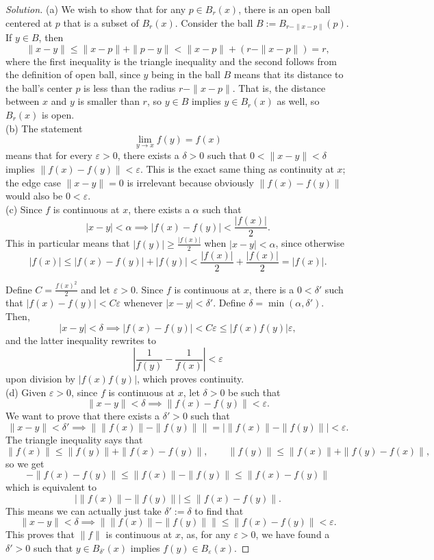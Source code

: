 \documentclass[11pt]{scrartcl}
\providecommand{\eps}{\varepsilon}
\newenvironment{soln}{\begin{proof}[Solution]}{\end{proof}}
\providecommand{\abs}[1]{\left|#1\right|}
\begin{document}
\begin{soln}
	(a) We wish to show that for any $p\in B_r(x)$, there is
	an open ball centered at $p$ that is a subset of $B_r(x)$.
	Consider the ball $B := B_{r-\|x-p\|}(p)$. If $y\in B$, then
	\[\|x-y\| \le \|x-p\| + \|p-y\| < \|x-p\| + (r - \|x-p\|) = r,\]
	where the first inequality is the triangle inequality
	and the second follows from the definition of open ball, since
	$y$ being in the ball $B$ means that its distance to
	the ball's center $p$ is less than the radius $r - \|x-p\|$.
	That is, the distance between $x$ and $y$ is smaller than $r$,
	so $y\in B$ implies $y\in B_r(x)$ as well, so $B_r(x)$ is open.\\
	
	(b) The statement
	\[\lim_{y\to x}f(y) = f(x)\]
	means that for every $\eps > 0$,
	there exists a $\delta > 0$ such that $0 < \|x-y\| < \delta$
	implies $\|f(x) - f(y)\| < \eps$. This is the exact same thing
	as continuity at $x$; the edge case $\|x-y\| = 0$ is irrelevant
	because obviously $\|f(x) - f(y)\|$ would also be $0 < \eps$.\\
	
	(c) Since $f$ is continuous at $x$, there exists a $\alpha$ such that
	\[|x-y|<\alpha\implies |f(x)-f(y)| < \frac{|f(x)|}{2}.\]
	This in particular means that $|f(y)| \ge \frac{|f(x)|}{2}$
	when $|x-y|<\alpha$, since otherwise
	\[|f(x)| \le |f(x) - f(y)| + |f(y)| <
	\frac{|f(x)|}{2} + \frac{|f(x)|}{2} = |f(x)|.\]
	
	Define $C = \frac{f(x)^2}{2}$ and let $\eps > 0$.
	Since $f$ is continuous at $x$, there is a $0 < \delta'$ such that
	$|f(x)-f(y)| < C\eps$ whenever $|x-y|<\delta'$.
	Define $\delta = \min(\alpha,\delta')$. Then,
	\[|x-y| < \delta\implies |f(x) - f(y)| < C\eps \le |f(x)f(y)|\eps,\]
	and the latter inequality rewrites to
	\[\left|\frac{1}{f(y)} - \frac{1}{f(x)}\right| < \eps\]
	upon division by $|f(x)f(y)|$, which proves continuity.
	\\
	
	(d) Given $\eps > 0$, since $f$ is continuous at $x$,
	let $\delta > 0$ be such that
	\[\|x-y\| < \delta \implies \|f(x) - f(y)\| < \eps.\]
	We want to prove that there exists a $\delta'>0$ such that
	\[\|x-y\| < \delta'\implies \| \|f(x)\| - \|f(y)\|\|
	= \abs{\|f(x)\| - \|f(y)\|} < \eps.\]
	The triangle inequality says that
	\[\|f(x)\| \le \|f(y)\| + \|f(x) - f(y)\|,\qquad
	\|f(y)\| \le \|f(x)\| + \|f(y) - f(x)\|,\]
	so we get
	\[-\|f(x) - f(y)\| \le \|f(x)\| - \|f(y)\| \le \|f(x) - f(y)\|\]
	which is equivalent to
	\[\abs{\|f(x)\| - \|f(y)\|} \le \|f(x) - f(y)\|.\]
	This means we can actually just take $\delta' := \delta$
	to find that
	\[\|x-y\|<\delta \implies \|\|f(x)\| - \|f(y)\|\|
	\le \|f(x)-f(y)\| < \eps.\]
	This proves that $\|f\|$ is continuous at $x$,
	as, for any $\eps>0$, we have found a $\delta'>0$
	such that $y\in B_{\delta'}(x)$ implies $f(y)\in B_\eps(x)$.
	

\end{soln}
\end{document}
